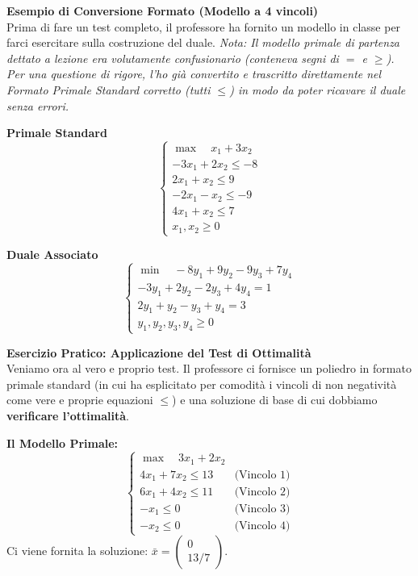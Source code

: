 \documentclass[12pt, a4paper]{article}
\newcommand{\separatore}{\noindent{\color{titlecolor!50}\rule{\textwidth}{0.6pt}}}
\begin{document}
	\vspace{0.4cm}
	\textbf{Esempio di Conversione Formato (Modello a 4 vincoli)}\\
	Prima di fare un test completo, il professore ha fornito un modello in classe per farci esercitare sulla costruzione del duale. 
	\textit{Nota: Il modello primale di partenza dettato a lezione era volutamente confusionario (conteneva segni di $=$ e $\geq$). Per una questione di rigore, l'ho già convertito e trascritto direttamente nel Formato Primale Standard corretto (tutti $\leq$) in modo da poter ricavare il duale senza errori.}
	
	\noindent
	\begin{minipage}[t]{0.48\textwidth}
		\centering
		\textbf{Primale Standard}
		\[
		\begin{cases}
			\max \quad x_1 + 3x_2 \\[6pt]
			-3x_1 + 2x_2 \leq -8 \\
			2x_1 + x_2 \leq 9 \\
			-2x_1 - x_2 \leq -9 \\
			4x_1 + x_2 \leq 7 \\[6pt]
			x_1, x_2 \geq 0
		\end{cases}
		\]
	\end{minipage}%
	\hfill%
	\begin{minipage}[t]{0.48\textwidth}
		\centering
		\textbf{Duale Associato}
		\[
		\begin{cases}
			\min \quad -8y_1 + 9y_2 - 9y_3 + 7y_4 \\[6pt]
			-3y_1 + 2y_2 - 2y_3 + 4y_4 = 1 \\
			2y_1 + y_2 - y_3 + y_4 = 3 \\[6pt]
			y_1, y_2, y_3, y_4 \geq 0
		\end{cases}
		\]
	\end{minipage}
	
	\vspace{0.6cm}
	\separatore
	\vspace{0.4cm}
	
	\textbf{Esercizio Pratico: Applicazione del Test di Ottimalità}\\
	Veniamo ora al vero e proprio test. Il professore ci fornisce un poliedro in formato primale standard (in cui ha esplicitato per comodità i vincoli di non negatività come vere e proprie equazioni $\leq$) e una soluzione di base di cui dobbiamo \textbf{verificare l'ottimalità}.
	
	\textbf{Il Modello Primale:}
	\[
	\begin{cases}
		\max \quad 3x_1 + 2x_2 \\[6pt]
		4x_1 + 7x_2 \leq 13 \quad &\text{(Vincolo 1)} \\
		6x_1 + 4x_2 \leq 11 \quad &\text{(Vincolo 2)} \\
		-x_1 \leq 0 \quad &\text{(Vincolo 3)} \\
		-x_2 \leq 0 \quad &\text{(Vincolo 4)}
	\end{cases}
	\]
	Ci viene fornita la soluzione: $\bar{x} = \begin{pmatrix} 0 \\ 13/7 \end{pmatrix}$.
	
\end{document}
